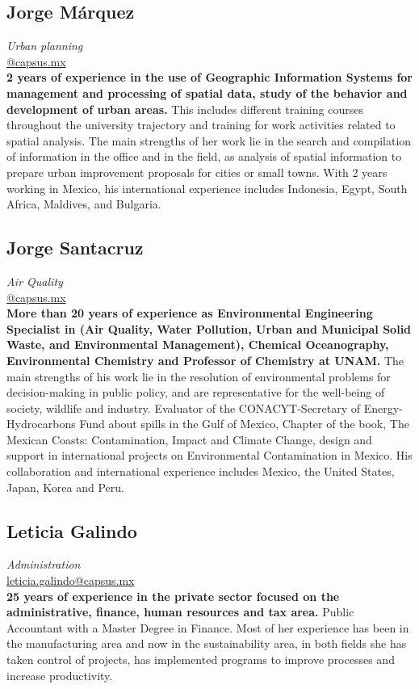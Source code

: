 \documentclass[
	a4paper,
	12pt,
	unnumberedsections,
]{CSSullivanBusinessReport}
\begin{document}
\subsection*{Jorge Márquez}
\textit{Urban planning} \\
\href{mailto:@capsus.mx}{@capsus.mx} \\[0.5em]
\textbf{2 years of experience in the use of Geographic Information Systems for management and processing of spatial data, study of the behavior and development of urban areas.} This includes different training courses throughout the university trajectory and training for work activities related to spatial analysis. The main strengths of her work lie in the search and compilation of information in the office and in the field, as analysis of spatial information to prepare urban improvement proposals for cities or small towns. With 2 years working in Mexico, his international experience includes Indonesia, Egypt, South Africa, Maldives, and Bulgaria.

\subsection*{Jorge Santacruz}
\textit{Air Quality} \\
\href{mailto:@capsus.mx}{@capsus.mx} \\[0.5em]
\textbf{More than 20 years of experience as Environmental Engineering Specialist in (Air Quality, Water Pollution, Urban and Municipal Solid Waste, and Environmental Management), Chemical Oceanography, Environmental Chemistry and Professor of Chemistry at UNAM.} The main strengths of his work lie in the resolution of environmental problems for decision-making in public policy, and are representative for the well-being of society, wildlife and industry. Evaluator of the CONACYT-Secretary of Energy-Hydrocarbons Fund about spills in the Gulf of Mexico, Chapter of the book, The Mexican Coasts: Contamination, Impact and Climate Change, design and support in international projects on Environmental Contamination in Mexico. His collaboration and international experience includes Mexico, the United States, Japan, Korea and Peru.

\subsection*{Leticia Galindo}
\textit{Administration} \\
\href{mailto:leticia.galindo@capsus.mx}{leticia.galindo@capsus.mx} \\[0.5em]
\textbf{25 years of experience in the private sector focused on the administrative, finance, human resources and tax area.} Public Accountant with a Master Degree in Finance. Most of her experience has been in the manufacturing area and now in the sustainability area, in both fields she has taken control of projects, has implemented programs to improve processes and increase productivity.
\end{document}

